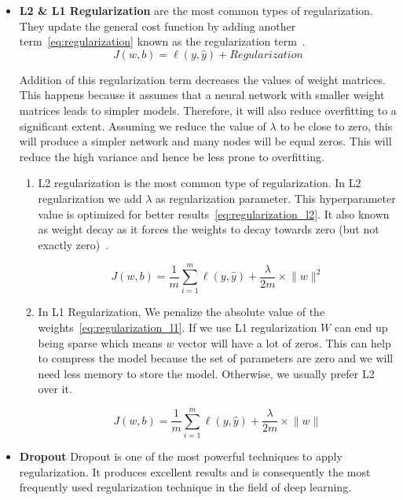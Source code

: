 \begin{itemize}
\item \textbf{L2 \& L1 Regularization} are the most common types of regularization. They update the general cost function by adding another term~\eqref{eq:regularization} known as the regularization term~\cite{Web_Analyticsvidhya_Regularization}.
\begin{equation}\label{eq:regularization}
 J(w,b) = \ell(y,\widehat{y}) + Regularization
  \end{equation}

Addition of this regularization term decreases the values of weight matrices. This happens because it assumes that a neural network with smaller weight matrices leads to simpler models. Therefore, it will also reduce overfitting to a significant extent. Assuming we reduce the value of $\lambda$ to be close to zero, this will produce a simpler network and many nodes will be equal zeros. This will reduce the high variance  and hence be less prone to overfitting.

\begin{enumerate}
\item L2 regularization is the most common type of regularization. In L2 regularization we add $\lambda$ as regularization parameter. This  hyperparameter value is optimized for better results~\eqref{eq:regularization_l2}. It also known as weight decay as it forces the weights to decay towards zero (but not exactly zero)~\cite{Web_Analyticsvidhya_Regularization}.%

\begin{equation}\label{eq:regularization_l2}
J(w,b) = \frac{1}{m} \sum_{i=1}^{m} \ell(y,\widehat{y})+\frac{\lambda}{2m} \times \lVert w \rVert^2
\end{equation}%

\item In L1 Regularization, We penalize the absolute value of the weights~\eqref{eq:regularization_l1}. If we use L1 regularization $W$ can end up being sparse which means $w$ vector will have a lot of zeros. This can help to compress the model because the set of parameters are zero and we will need less memory to store the model. Otherwise, we usually prefer L2 over it.

\begin{equation}\label{eq:regularization_l1}
J(w,b) = \frac{1}{m} \sum_{i=1}^{m} \ell(y,\widehat{y})+\frac{\lambda}{2m} \times \lVert w \rVert
\end{equation}
   \end{enumerate}
  \item \textbf{Dropout}
Dropout is one of the most powerful techniques to apply regularization. It produces excellent results and is consequently the most frequently used regularization technique in the field of deep learning.


\end{itemize}
